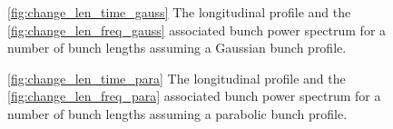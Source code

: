 \begin{figure}
\caption{\ref{fig:change_len_time_gauss} The longitudinal profile and the \ref{fig:change_len_freq_gauss} associated bunch power spectrum for a number of bunch lengths assuming a Gaussian bunch profile.}
\label{fig:diff_bunch_len_gauss}
\end{figure}

\begin{figure}
\caption{\ref{fig:change_len_time_para} The longitudinal profile and the \ref{fig:change_len_freq_para} associated bunch power spectrum for a number of bunch lengths assuming a parabolic bunch profile.}
\label{fig:diff_bunch_len_para}
\end{figure}

